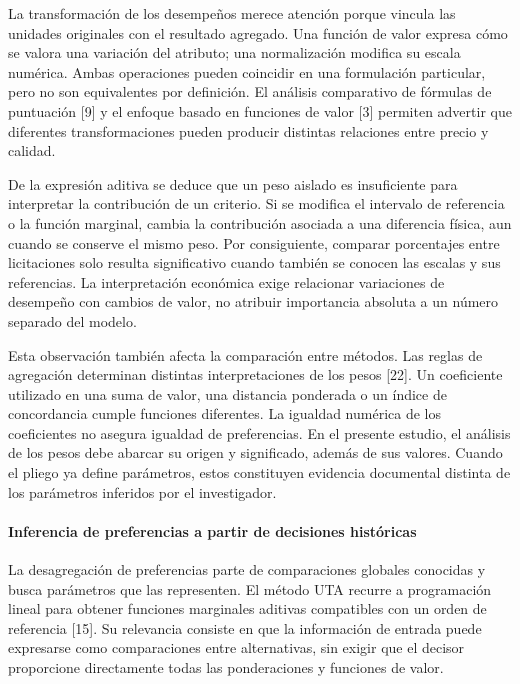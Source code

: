 \documentclass[12pt,a4paper]{article}
\begin{document}
La transformación de los desempeños merece atención porque vincula las unidades originales con el resultado agregado. Una función de valor expresa cómo se valora una variación del atributo; una normalización modifica su escala numérica. Ambas operaciones pueden coincidir en una formulación particular, pero no son equivalentes por definición. El análisis comparativo de fórmulas de puntuación [9] y el enfoque basado en funciones de valor [3] permiten advertir que diferentes transformaciones pueden producir distintas relaciones entre precio y calidad.

De la expresión aditiva se deduce que un peso aislado es insuficiente para interpretar la contribución de un criterio. Si se modifica el intervalo de referencia o la función marginal, cambia la contribución asociada a una diferencia física, aun cuando se conserve el mismo peso. Por consiguiente, comparar porcentajes entre licitaciones solo resulta significativo cuando también se conocen las escalas y sus referencias. La interpretación económica exige relacionar variaciones de desempeño con cambios de valor, no atribuir importancia absoluta a un número separado del modelo.

Esta observación también afecta la comparación entre métodos. Las reglas de agregación determinan distintas interpretaciones de los pesos [22]. Un coeficiente utilizado en una suma de valor, una distancia ponderada o un índice de concordancia cumple funciones diferentes. La igualdad numérica de los coeficientes no asegura igualdad de preferencias. En el presente estudio, el análisis de los pesos debe abarcar su origen y significado, además de sus valores. Cuando el pliego ya define parámetros, estos constituyen evidencia documental distinta de los parámetros inferidos por el investigador.

\paragraph{Inferencia de preferencias a partir de decisiones históricas}

La desagregación de preferencias parte de comparaciones globales conocidas y busca parámetros que las representen. El método UTA recurre a programación lineal para obtener funciones marginales aditivas compatibles con un orden de referencia [15]. Su relevancia consiste en que la información de entrada puede expresarse como comparaciones entre alternativas, sin exigir que el decisor proporcione directamente todas las ponderaciones y funciones de valor.
\end{document}
